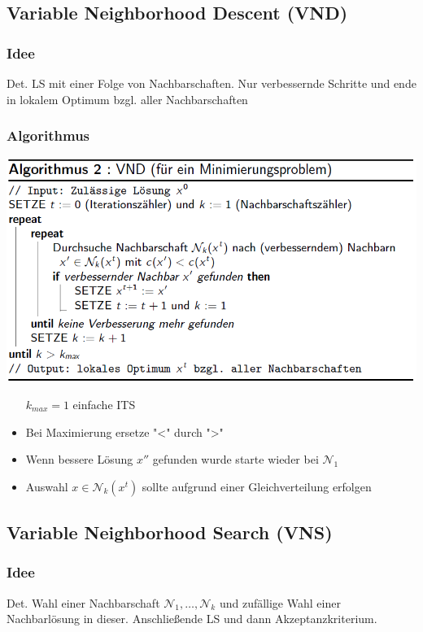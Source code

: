 \documentclass[12pt]{article}
\begin{document}
		\subsection{Variable Neighborhood Descent (VND)}
			\subsubsection{Idee}
				Det. LS mit einer Folge von Nachbarschaften. Nur verbessernde Schritte und ende in lokalem Optimum bzgl. aller Nachbarschaften
			\subsubsection{Algorithmus}
				\includegraphics[scale=0.6]{VND}
				\begin{itemize}
					\item[\texttt{$k_{max}=1$}] einfache ITS
					\item Bei Maximierung ersetze "<" durch ">"
					\item Wenn bessere Lösung $x''$ gefunden wurde starte wieder bei $\mathcal{N}_1$
					\item Auswahl $x\in\mathcal{N}_k(x^t)$ sollte aufgrund einer Gleichverteilung erfolgen
				\end{itemize}
		\subsection{Variable Neighborhood Search (VNS)}
			\subsubsection{Idee}
				Det. Wahl einer Nachbarschaft $\mathcal{N}_1, \dots, \mathcal{N}_k$ und zufällige Wahl einer Nachbarlösung in dieser. Anschließende LS und dann Akzeptanzkriterium.
\end{document}
